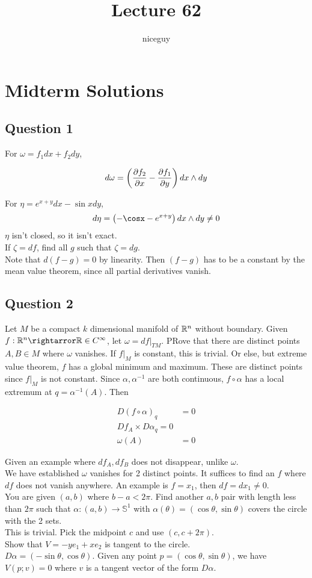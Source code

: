 \documentclass[12pt]{article}
\title{Lecture 62}
\author{niceguy}
\begin{document}
\maketitle

\section{Midterm Solutions}

\subsection{Question 1}

For $\omega = f_1dx + f_2dy$,

$$d\omega = \left(\frac{\partial f_2}{\partial x} - \frac{\partial f_1}{\partial y}\right)dx \wedge dy$$

For $\eta = e^{x+y}dx - \sin xdy$,
$$d\eta = \left(-\cosx - e^{x+y}\right)dx \wedge dy \neq 0$$
$\eta$ isn't closed, so it isn't exact. \\
If $\zeta = df$, find all $g$ such that $\zeta = dg$. \\
Note that $d(f-g) = 0$ by linearity. Then $(f-g)$ has to be a constant by the mean value theorem, since all partial derivatives vanish.

\subsection{Question 2}

Let $M$ be a compact $k$ dimensional manifold of $\mathbb{R}^n$ without boundary. Given $f:\R^n\rightarror\R \in C^\infty$, let $\omega = df|_{TM}$. PRove that there are distinct points $A,B \in M$ where $\omega$ vanishes. If $f|_M$ is constant, this is trivial. Or else, but extreme value theorem, $f$ has a global minimum and maximum. These are distinct points since $f|_M$ is not constant. Since $\alpha,\alpha^{-1}$ are both continuous, $f\circ\alpha$ has a local extremum at $q = \alpha^{-1}(A)$. Then

\begin{align*}
    D(f\circ\alpha)_q &= 0 \\
    Df_A \times D\alpha_q = 0 \\
    \omega(A) &= 0
\end{align*}

Given an example where $df_A, df_B$ does not disappear, unlike $\omega$. \\
We have established $\omega$ vanishes for 2 distinct points. It suffices to find an $f$ where $df$ does not vanish anywhere. An example is $f = x_1$, then $df = dx_1 \neq 0$. \\
You are given $(a,b)$ where $b - a < 2\pi$. Find another $a,b$ pair with length less than $2\pi$ such that $\alpha:(a,b) \rightarrow \mathbb S^1$ with $\alpha(\theta) = (\cos\theta,\sin\theta)$ covers the circle with the 2 sets. \\
This is trivial. Pick the midpoint $c$ and use $(c,c+2\pi)$. \\
Show that $V = -ye_1 + xe_2$ is tangent to the circle. \\
$D\alpha = (-\sin\theta,\cos\theta)$. Given any point $p = (\cos\theta,\sin\theta)$, we have $V(p;v) = 0$ where $v$ is a tangent vector of the form $D\alpha$.
\end{document}
